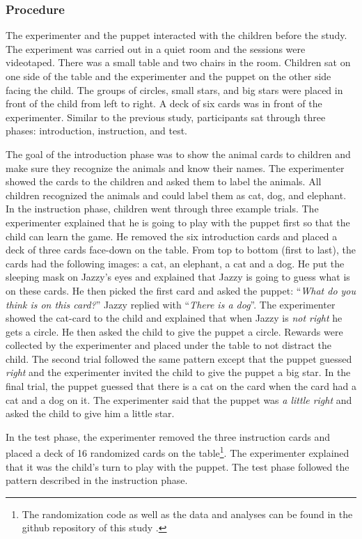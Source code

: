 \documentclass[10pt, letterpaper]{article}
\begin{document}
\subsubsection{Procedure}\label{procedure-1}

The experimenter and the puppet interacted with the children before the
study. The experiment was carried out in a quiet room and the sessions
were videotaped. There was a small table and two chairs in the room.
Children sat on one side of the table and the experimenter and the
puppet on the other side facing the child. The groups of circles, small
stars, and big stars were placed in front of the child from left to
right. A deck of six cards was in front of the experimenter. Similar to
the previous study, participants sat through three phases: introduction,
instruction, and test.

The goal of the introduction phase was to show the animal cards to
children and make sure they recognize the animals and know their names.
The experimenter showed the cards to the children and asked them to
label the animals. All children recognized the animals and could label
them as cat, dog, and elephant. In the instruction phase, children went
through three example trials. The experimenter explained that he is
going to play with the puppet first so that the child can learn the
game. He removed the six introduction cards and placed a deck of three
cards face-down on the table. From top to bottom (first to last), the
cards had the following images: a cat, an elephant, a cat and a dog. He
put the sleeping mask on Jazzy's eyes and explained that Jazzy is going
to guess what is on these cards. He then picked the first card and asked
the puppet: ``\emph{What do you think is on this card?}'' Jazzy replied
with ``\emph{There is a dog}''. The experimenter showed the cat-card to
the child and explained that when Jazzy is \emph{not right} he gets a
circle. He then asked the child to give the puppet a circle. Rewards
were collected by the experimenter and placed under the table to not
distract the child. The second trial followed the same pattern except
that the puppet guessed \emph{right} and the experimenter invited the
child to give the puppet a big star. In the final trial, the puppet
guessed that there is a cat on the card when the card had a cat and a
dog on it. The experimenter said that the puppet was \emph{a little
right} and asked the child to give him a little star.

In the test phase, the experimenter removed the three instruction cards
and placed a deck of 16 randomized cards on the
table\footnote{The randomization code as well as the data and analyses can be found in the github repository of this study .}.
The experimenter explained that it was the child's turn to play with the
puppet. The test phase followed the pattern described in the instruction
phase.
\end{document}
